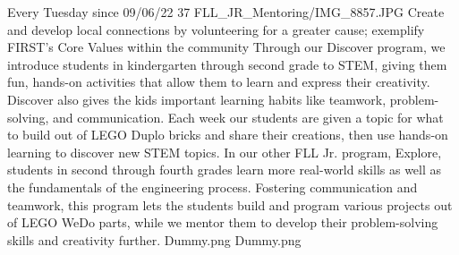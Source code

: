 {Every Tuesday since 09/06/22}
{37}
{FLL_JR_Mentoring/IMG_8857.JPG}
{Create and develop local connections by volunteering for a greater cause; exemplify FIRST's Core Values within the community} 
{Through our Discover program, we introduce students in kindergarten through second grade to STEM, giving them fun, hands-on activities that allow them to learn and express their creativity. Discover also gives the kids important learning habits like teamwork, problem-solving, and communication. Each week our students are given a topic for what to build out of LEGO Duplo bricks and share their creations, then use hands-on learning to discover new STEM topics. In our other FLL Jr. program, Explore, students in second through fourth grades learn more real-world skills as well as the fundamentals of the engineering process. Fostering communication and teamwork, this program lets the students build and program various projects out of LEGO WeDo parts, while we mentor them to develop their problem-solving skills and creativity further.
} 
{Dummy.png}
{Dummy.png}
